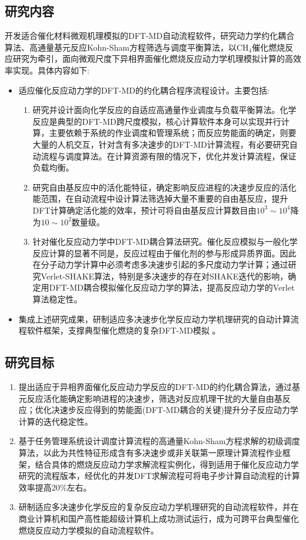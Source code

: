 \subsection{研究内容}
开发适合催化材料微观机理模拟的\textrm{DFT-MD}自动流程软件，研究动力学约化耦合算法、高通量基元反应\textrm{Kohn-Sham}方程筛选与调度平衡算法，以$\mathrm{CH}_4$催化燃烧反应研究为牵引，面向微观尺度下异相界面催化燃烧反应动力学机理模拟计算的高效率实现。具体内容如下:
\begin{itemize}
	\item 适应催化反应动力学的\textrm{DFT-MD}的约化耦合程序流程设计。主要包括:
		\begin{enumerate}
			\item 研究并设计面向化学反应的自适应高通量作业调度与负载平衡算法。化学反应是典型的\textrm{DFT-MD}跨尺度模拟，核心计算软件本身可以实现并行计算，主要依赖于系统的作业调度和管理系统；而反应势能面的确定，则要大量的人机交互，针对含有多决速步的\textrm{DFT-MD}计算流程，有必要研究自动流程与调度算法。在计算资源有限的情况下，优化并发计算流程，保证负载均衡。
			\item 研究自由基反应中的活化能特征，确定影响反应进程的决速步反应的活化能范围，在自动流程中设计算法筛选掉大量不重要的自由基反应，提升\textrm{DFT}计算确定活化能的效率，预计可将自由基反应计算数目由$10^3\sim10^4$降为$10\sim10^2$数量级。
			\item 针对催化反应动力学中\textrm{DFT-MD}耦合算法研究。催化反应模拟与一般化学反应计算的显著不同是，反应过程由于催化剂的参与形成异质界面。因此在分子动力学计算中必须考虑多决速步引起的多尺度动力学计算；通过研究\textrm{Verlet-SHAKE}算法，特别是多决速步的存在对\textrm{SHAKE}迭代的影响，确定用\textrm{DFT-MD}耦合模拟催化反应动力学的算法，提高反应动力学的\textrm{Verlet}算法稳定性。
		\end{enumerate}

	\item 集成上述研究成果，研制适应多决速步化学反应动力学机理研究的自动计算流程软件框架，支撑典型催化燃烧的复杂\textrm{DFT-MD}模拟 。
\end{itemize}
\subsection{研究目标}
\begin{enumerate}
	\item 提出适应于异相界面催化反应动力学反应的\textrm{DFT-MD}的约化耦合算法，通过基元反应活化能确定影响进程的决速步，筛选对反应机理干扰的大量自由基反应；优化决速步反应得到的势能面(\textrm{DFT-MD}耦合的关键)提升分子反应动力学计算的迭代稳定性。
	\item 基于任务管理系统设计调度计算流程的高通量\textrm{Kohn-Sham}方程求解的初级调度算法，以此为共性特征形成含有多决速步或非关联第一原理计算流程作业框架，结合具体的燃烧反应动力学求解流程实例化，得到适用于催化反应动力学研究的流程版本，经优化的并发DFT求解流程可将电子步计算自动流程的计算效率提高20\%左右。
	\item 研制适应多决速步化学反应的复杂反应动力学机理研究的自动流程软件，并在商业计算机和国产高性能超级计算机上成功测试运行，成为可跨平台典型催化燃烧反应动力学模拟的自动流程软件。
\end{enumerate}

